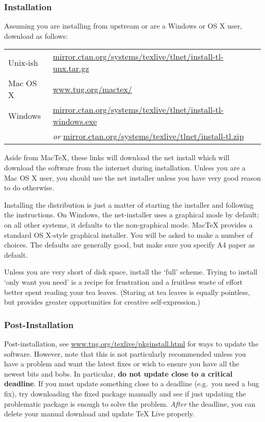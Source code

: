 
\subsubsection<1-| beamer:0>{Installation}\label{subsubsec:inst}

Assuming you are installing from upstream or are a Windows or OS X user, download as follows:

\begin{tabular}{@{}ll@{}}
  Unix-ish  & \url{mirror.ctan.org/systems/texlive/tlnet/install-tl-unx.tar.gz}\\
  Mac OS X &  \url{www.tug.org/mactex/}\\
  Windows & \url{mirror.ctan.org/systems/texlive/tlnet/install-tl-windows.exe}\\
  & \emph{or} \url{mirror.ctan.org/systems/texlive/tlnet/install-tl.zip}\\
\end{tabular}

\noindent Aside from Mac\TeX{}, these links will download the net install which will download the software from the internet during installation.
Unless you are a Mac OS X user, you should use the net installer unless you have very good reason to do otherwise. 

Installing the distribution is just a matter of starting the installer and following the instructions.
On Windows, the net-installer uses a graphical mode by default; on all other systems, it defaults to the non-graphical mode.
Mac\TeX{} provides a standard OS X-style graphical installer.
You will be asked to make a number of choices.
The defaults are generally good, but make sure you specify A4 paper as default.

Unless you are very short of disk space, install the ‘full’ scheme.
Trying to install ‘only want you need’ is a recipe for frustration and a fruitless waste of effort better spent reading your tea leaves. 
(Staring at tea leaves is equally pointless, but provides greater opportunities for creative self-expression.)


\subsubsection<1-| beamer:0>{Post-Installation}\label{subsubsec:post}

Post-installation, see \url{www.tug.org/texlive/pkginstall.html} for ways to update the software.
However, note that this is not particularly recommended unless you have a problem and want the latest fixes or wish to ensure you have all the newest bits and bobs.
In particular, \textbf{do not update close to a critical deadline}.
If you must update something close to a deadline (e.g.~you need a bug fix), try downloading the fixed package manually and see if just updating the problematic package is enough to solve the problem.
\emph{After} the deadline, you can delete your manual download and update \TeX{} Live properly.

